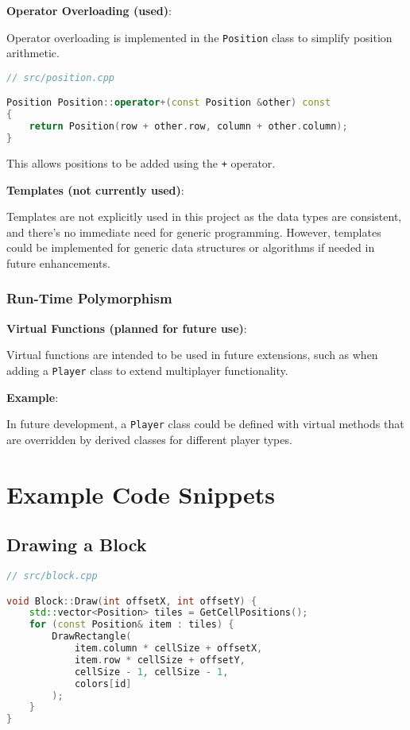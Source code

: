 \documentclass{article}
\begin{document}
\textbf{Operator Overloading (used)}:

Operator overloading is implemented in the \texttt{Position} class to simplify position arithmetic.

\begin{lstlisting}[language=C++]
// src/position.cpp

Position Position::operator+(const Position &other) const
{
    return Position(row + other.row, column + other.column);
}
\end{lstlisting}

This allows positions to be added using the \texttt{+} operator.

\textbf{Templates (not currently used)}:

Templates are not explicitly used in this project as the data types are consistent, and there's no immediate need for generic programming. However, templates could be implemented for generic data structures or algorithms if needed in future enhancements.

\subsubsection{Run-Time Polymorphism}

\textbf{Virtual Functions (planned for future use)}:

Virtual functions are intended to be used in future extensions, such as when adding a \texttt{Player} class to extend multiplayer functionality.

\textbf{Example}:

In future development, a \texttt{Player} class could be defined with virtual methods that are overridden by derived classes for different player types.

\section{Example Code Snippets}

\subsection{Drawing a Block}

\begin{lstlisting}[language=C++]
// src/block.cpp

void Block::Draw(int offsetX, int offsetY) {
    std::vector<Position> tiles = GetCellPositions();
    for (const Position& item : tiles) {
        DrawRectangle(
            item.column * cellSize + offsetX,
            item.row * cellSize + offsetY,
            cellSize - 1, cellSize - 1,
            colors[id]
        );
    }
}
\end{lstlisting}
\end{document}
